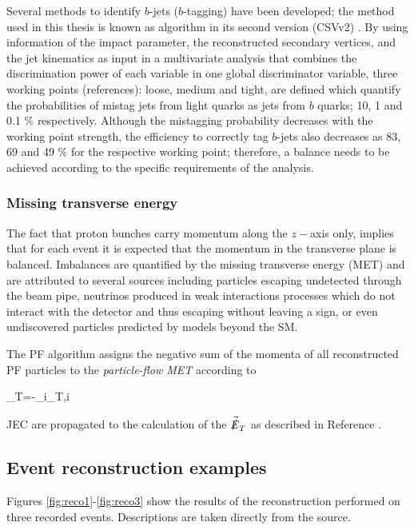 Several methods to identify $b$-jets ($b$-tagging) have been developed; the method used in this thesis is known as  algorithm in its second version (CSVv2) \cite{btag}. By using information of the impact parameter, the reconstructed secondary vertices, and the jet kinematics as input in a multivariate analysis that combines the discrimination power of each variable in one global discriminator variable, three working points (references): loose, medium and tight, are defined which quantify the probabilities of mistag jets from light quarks as jets from $b$ quarks; 10, 1 and 0.1 \% respectively. Although the mistagging probability decreases with the working point strength, the efficiency to correctly tag $b$-jets also decreases as 83, 69 and 49 \% for the respective working point; therefore, a balance needs to be achieved according to the specific requirements of the analysis.

\subsubsection{Missing transverse energy}\label{sssec:met}

The fact that proton bunches carry momentum along the $z-$axis only, implies that for each event it is expected that the momentum in the transverse plane is balanced. Imbalances are quantified by the missing transverse energy (MET) and are attributed to several sources including particles escaping undetected through the beam pipe, neutrinos produced in weak interactions processes which do not interact with the detector and thus escaping without leaving a sign, or even undiscovered particles predicted by models beyond the SM.

The PF algorithm assigns the negative sum of the momenta of all reconstructed PF particles to the \textit{particle-flow MET} according to

\beqn
{}_T=-\sum_{i}_{T,i}
\eeqn

JEC are propagated to the calculation of the $\vec{\slashed{E}}_T$ as described in Reference \cite{metcorr}.

\subsection{Event reconstruction examples}

Figures \ref{fig:reco1}-\ref{fig:reco3} show the results of the reconstruction performed on three recorded events. Descriptions are taken directly from the source. 

